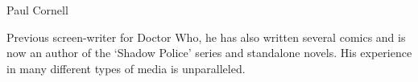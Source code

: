 {\Large Paul Cornell}

\begin{figure}
	\vspace{-10mm}
	\vspace{-10mm}
\end{figure}

Previous screen-writer for Doctor Who, he has also written several comics and is now an author of the ‘Shadow Police’ series and standalone novels. His experience in many different types of media is unparalleled. 